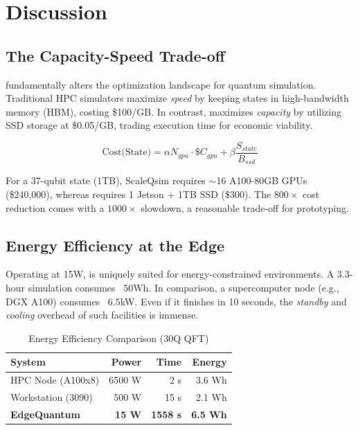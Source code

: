 \section{Discussion}
\label{sec:discussion}

\subsection{The Capacity-Speed Trade-off}

\EdgeQuantum fundamentally alters the optimization landscape for quantum simulation. Traditional HPC simulators maximize \textit{speed} by keeping states in high-bandwidth memory (HBM), costing \$100/GB. In contrast, \EdgeQuantum maximizes \textit{capacity} by utilizing SSD storage at \$0.05/GB, trading execution time for economic viability.

\begin{equation}
\text{Cost(State)} = \alpha N_{gpu} \cdot \$C_{gpu} + \beta \frac{S_{state}}{B_{ssd}}
\end{equation}

For a 37-qubit state (1TB), ScaleQsim requires $\sim$16 A100-80GB GPUs (\$240,000), whereas \EdgeQuantum requires 1 Jetson + 1TB SSD (\$300). The $800\times$ cost reduction comes with a $1000\times$ slowdown, a reasonable trade-off for prototyping.

\subsection{Energy Efficiency at the Edge}

Operating at 15W, \EdgeQuantum is uniquely suited for energy-constrained environments. A 3.3-hour simulation consumes ~50Wh. In comparison, a supercomputer node (e.g., DGX A100) consumes ~6.5kW. Even if it finishes in 10 seconds, the \textit{standby} and \textit{cooling} overhead of such facilities is immense.

\begin{table}[H]
\centering
\caption{Energy Efficiency Comparison (30Q QFT)}
\small
\begin{tabular}{lrrr}
\toprule
\textbf{System} & \textbf{Power} & \textbf{Time} & \textbf{Energy} \\
\midrule
HPC Node (A100x8) & 6500 W & 2 s & 3.6 Wh \\
Workstation (3090) & 500 W & 15 s & 2.1 Wh \\
\textbf{EdgeQuantum} & \textbf{15 W} & \textbf{1558 s} & \textbf{6.5 Wh} \\
\bottomrule
\end{tabular}
\label{tab:energy}
\end{table}

